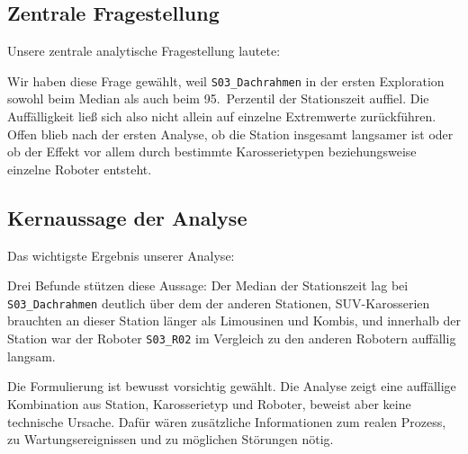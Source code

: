 \documentclass[a4paper, 11pt]{article}
\begin{document}
\subsection{Zentrale Fragestellung}

Unsere zentrale analytische Fragestellung lautete:

\begin{center}
\end{center}

Wir haben diese Frage gewählt, weil \texttt{S03\_Dachrahmen} in der ersten Exploration sowohl beim Median als auch beim 95.\ Perzentil der Stationszeit auffiel. Die Auffälligkeit ließ sich also nicht allein auf einzelne Extremwerte zurückführen. Offen blieb nach der ersten Analyse, ob die Station insgesamt langsamer ist oder ob der Effekt vor allem durch bestimmte Karosserietypen beziehungsweise einzelne Roboter entsteht.

\subsection{Kernaussage der Analyse}

Das wichtigste Ergebnis unserer Analyse:

\begin{center}
\end{center}

Drei Befunde stützen diese Aussage: Der Median der Stationszeit lag bei \texttt{S03\_Dachrahmen} deutlich über dem der anderen Stationen, SUV-Karosserien brauchten an dieser Station länger als Limousinen und Kombis, und innerhalb der Station war der Roboter \texttt{S03\_R02} im Vergleich zu den anderen Robotern auffällig langsam.

Die Formulierung ist bewusst vorsichtig gewählt. Die Analyse zeigt eine auffällige Kombination aus Station, Karosserietyp und Roboter, beweist aber keine technische Ursache. Dafür wären zusätzliche Informationen zum realen Prozess, zu Wartungsereignissen und zu möglichen Störungen nötig.
\end{document}
